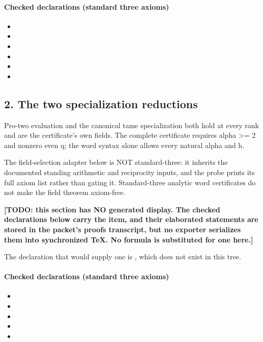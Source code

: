 \paragraph{Checked declarations (standard three axioms)}
\begin{itemize}
\item {}
\item {}
\item {}
\item {}
\item {}
\item {}
\end{itemize}

\subsection*{2. The two specialization reductions}
Pro-two evaluation and the canonical tame specialization both hold at every rank and are the certificate's own fields. The complete certificate requires alpha >= 2 and nonzero even q; the word syntax alone allows every natural alpha and h.

The field-selection adapter below is NOT standard-three: it inherits the documented standing arithmetic and reciprocity inputs, and the probe prints its full axiom list rather than gating it. Standard-three analytic word certificates do not make the field theorem axiom-free.

\par\noindent\textbf{[TODO: this section has NO generated display. The checked declarations below carry the item, and their elaborated statements are stored in the packet's proofs transcript, but no exporter serializes them into synchronized TeX. No formula is substituted for one here.]}
\par\noindent The declaration that would supply one is , which does not exist in this tree.
\paragraph{Checked declarations (standard three axioms)}
\begin{itemize}
\item {}
\item {}
\item {}
\item {}
\item {}
\end{itemize}
